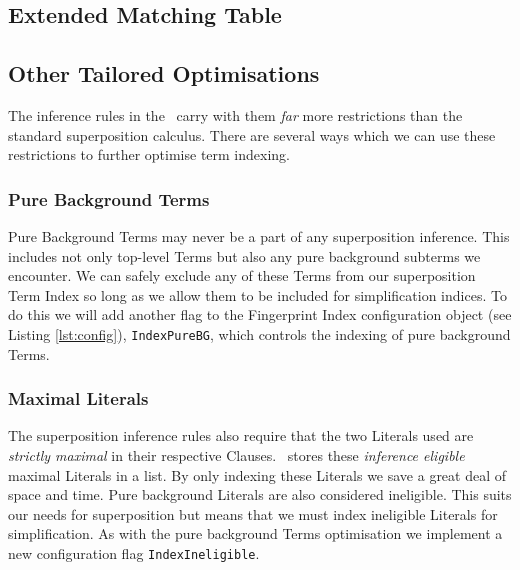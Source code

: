 \subsection{Extended Matching Table}

\subsection{Other Tailored Optimisations}

The inference rules in the \HSWAC\ carry with them \emph{far} more restrictions
than the standard superposition calculus. There are several ways which we can
use these restrictions to further optimise term indexing.

\subsubsection{Pure Background Terms}
Pure Background Terms may never be a part of any superposition inference.
This includes not only top-level Terms but also any pure background subterms we encounter.
We can safely exclude any of these Terms from our superposition Term Index so long as we allow them to
be included for simplification indices. To do this we will add another flag
to the Fingerprint Index configuration object (see Listing \ref{lst:config}),
\verb!IndexPureBG!, which controls the indexing of pure background Terms.

\subsubsection{Maximal Literals}
The superposition inference rules also require that the two Literals used are
\emph{strictly maximal} in their respective Clauses. \Beagle\ stores these
\emph{inference eligible} maximal Literals in a list. By only indexing these
Literals we save a great deal of space and time. Pure background Literals
are also considered ineligible. This suits our needs for superposition but means
that we must index ineligible Literals for simplification. As with the pure background Terms
optimisation we implement a new configuration flag \verb!IndexIneligible!.
